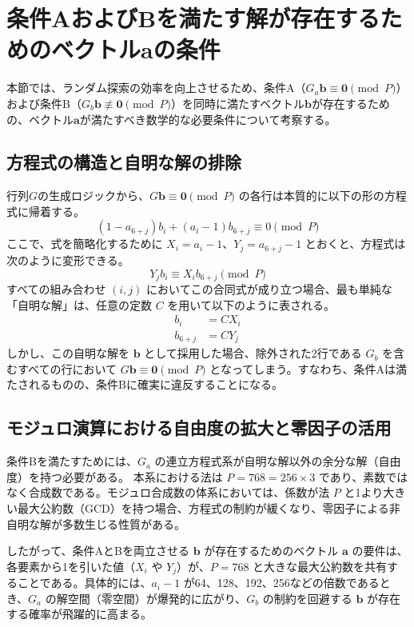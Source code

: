 \documentclass[a4paper,11pt,dvipdfmx]{jsarticle}
\theoremstyle{definition}
\begin{document}
\section{条件AおよびBを満たす解が存在するためのベクトル$\mathbf{a}$の条件}

本節では、ランダム探索の効率を向上させるため、条件A（$G_a \mathbf{b} \equiv \mathbf{0} \pmod P$）および条件B（$G_b \mathbf{b} \not\equiv \mathbf{0} \pmod P$）を同時に満たすベクトル$\mathbf{b}$が存在するための、ベクトル$\mathbf{a}$が満たすべき数学的な必要条件について考察する。

\subsection{方程式の構造と自明な解の排除}
行列$G$の生成ロジックから、$G \mathbf{b} \equiv \mathbf{0} \pmod P$ の各行は本質的に以下の形の方程式に帰着する。
\begin{equation}
    (1 - a_{6+j}) b_i + (a_i - 1) b_{6+j} \equiv 0 \pmod P
\end{equation}
ここで、式を簡略化するために $X_i = a_i - 1$、$Y_j = a_{6+j} - 1$ とおくと、方程式は次のように変形できる。
\begin{equation}
    Y_j b_i \equiv X_i b_{6+j} \pmod P
\end{equation}
すべての組み合わせ $(i, j)$ においてこの合同式が成り立つ場合、最も単純な「自明な解」は、任意の定数 $C$ を用いて以下のように表される。
\begin{align}
    b_i &= C X_i \\
    b_{6+j} &= C Y_j
\end{align}
しかし、この自明な解を $\mathbf{b}$ として採用した場合、除外された2行である $G_b$ を含むすべての行において $G \mathbf{b} \equiv \mathbf{0} \pmod P$ となってしまう。すなわち、条件Aは満たされるものの、条件Bに確実に違反することになる。

\subsection{モジュロ演算における自由度の拡大と零因子の活用}
条件Bを満たすためには、$G_a$ の連立方程式系が自明な解以外の余分な解（自由度）を持つ必要がある。
本系における法は $P = 768 = 256 \times 3$ であり、素数ではなく合成数である。モジュロ合成数の体系においては、係数が法 $P$ と1より大きい最大公約数（GCD）を持つ場合、方程式の制約が緩くなり、零因子による非自明な解が多数生じる性質がある。

したがって、条件AとBを両立させる $\mathbf{b}$ が存在するためのベクトル $\mathbf{a}$ の要件は、各要素から1を引いた値（$X_i$ や $Y_j$）が、$P=768$ と大きな最大公約数を共有することである。具体的には、$a_i - 1$ が64、128、192、256などの倍数であるとき、$G_a$ の解空間（零空間）が爆発的に広がり、$G_b$ の制約を回避する $\mathbf{b}$ が存在する確率が飛躍的に高まる。
\end{document}
